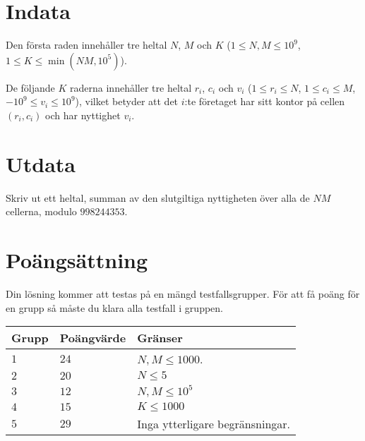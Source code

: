 \section*{Indata}
Den första raden innehåller tre heltal $N$, $M$ och $K$ ($1 \leq N,M \leq 10^9$, $1 \leq K \leq \min(NM, 10^5)$).

De följande $K$ raderna innehåller tre heltal $r_i$, $c_i$ och $v_i$ ($1 \leq r_i \leq N$, $1 \leq c_i \leq M$, $-10^9 \leq v_i \leq 10^9$), 
vilket betyder att det $i$:te företaget har sitt kontor på cellen $(r_i, c_i)$ och har nyttighet $v_i$.

\section*{Utdata}
Skriv ut ett heltal, summan av den slutgiltiga nyttigheten över alla de $NM$ cellerna, modulo $998244353$.

\section*{Poängsättning}
Din lösning kommer att testas på en mängd testfallsgrupper.
För att få poäng för en grupp så måste du klara alla testfall i gruppen.

\noindent
\begin{tabular}{| l | l | l |}
\hline
Grupp & Poängvärde & Gränser \\ \hline
$1$   & $24$       & $N,M \leq 1000$. \\ \hline
$2$   & $20$       & $N \leq 5$ \\ \hline
$3$   & $12$       & $N,M \leq 10^5$ \\ \hline
$4$   & $15$       & $K \leq 1000$ \\ \hline
$5$   & $29$       & Inga ytterligare begränsningar. \\ \hline

\end{tabular}
